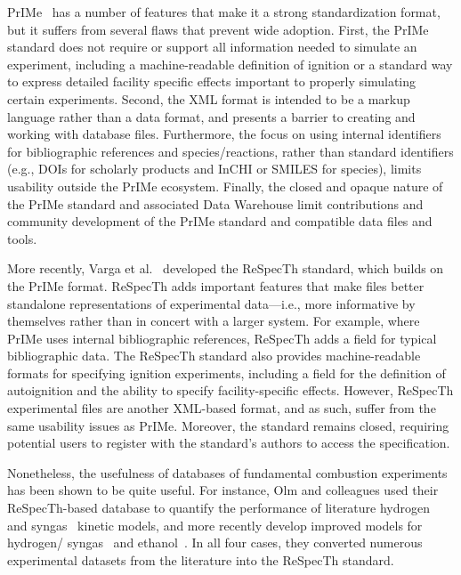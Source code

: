 \documentclass[12pt]{ussci}
\begin{document}
PrIMe~\autocite{Frenklach:2007bm,You:2011hy} has a number of features that make
it a strong standardization format, but it suffers from several flaws that
prevent wide adoption. First, the PrIMe standard does not require or support all
information needed to simulate an experiment, including a machine-readable
definition of ignition or a standard way to express detailed facility specific
effects important to properly simulating certain experiments. Second, the XML
format is intended to be a markup language rather than a data format, and
presents a barrier to creating and working with database files. Furthermore, the
focus on using internal identifiers for bibliographic references and
species\slash reactions, rather than standard identifiers (e.g., DOIs for
scholarly products and InCHI or SMILES for species), limits usability outside
the PrIMe ecosystem. Finally, the closed and opaque nature of the PrIMe standard
and associated Data Warehouse limit contributions and community development of
the PrIMe standard and compatible data files and tools.

More recently, Varga et al.~\autocite{Varga2015a,Varga2015b} developed the
ReSpecTh standard, which builds on the PrIMe format. ReSpecTh adds important
features that make files better standalone representations of experimental
data---i.e., more informative by themselves rather than in concert with a larger
system. For example, where PrIMe uses internal bibliographic references,
ReSpecTh adds a field for typical bibliographic data. The ReSpecTh standard also
provides machine-readable formats for specifying ignition experiments, including
a field for the definition of autoignition and the ability to specify
facility-specific effects. However, ReSpecTh experimental files are another
XML-based format, and as such, suffer from the same usability issues as PrIMe.
Moreover, the standard remains closed, requiring potential users to register
with the standard's authors to access the specification.

Nonetheless, the usefulness of databases of fundamental combustion experiments
has been shown to be quite useful. For instance, Olm and colleagues used their
ReSpecTh-based database to quantify the performance of literature
hydrogen~\autocite{Olm:2014gn} and syngas~\autocite{Olm:2015ch} kinetic models,
and more recently develop improved models for hydrogen\slash
syngas~\autocite{Varga:2016gj} and ethanol~\autocite{Olm:2016et}. In all four
cases, they converted numerous experimental datasets from the literature into
the ReSpecTh standard.
\end{document}
